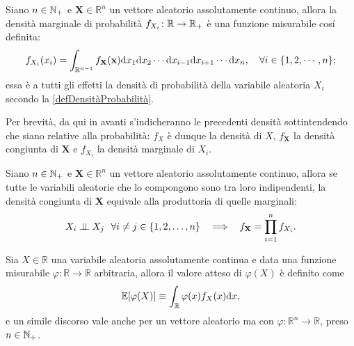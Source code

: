     \begin{dfn}
      \label{defDensitàMarginaleProbabilità}
      Siano \(n\in\mathbb N_+\) e \(\mathbf X\in\mathbb R^n\) un vettore aleatorio assolutamente continuo, allora la densità marginale di probabilità \(f_{X_i}\colon\mathbb R\to\mathbb R_+\) è una funzione misurabile cosí definita:
      \begin{equation}
        \label{eqDensitàMarginaleProbabilità}
        f_{X_i}(x_i)=\int_{\mathbb R^{n-1}}
        f_{\mathbf X}(\mathbf x)\mathrm{d} x_1\mathrm{d} x_2\cdots\mathrm{d} x_{i-1}\mathrm{d} x_{i+1}\cdots\mathrm{d} x_n,
        \quad\forall i\in\{1,2,\cdots,n\};
      \end{equation}
      essa è a tutti gli effetti la densità di probabilità della variabile aleatoria \(X_i\) secondo la \cref{defDensitàProbabilità}.
    \end{dfn}

    \begin{oss}
      Per brevità, da qui in avanti s'indicheranno le precedenti densità sottintendendo che siano relative alla probabilità: \(f_X\) è dunque la densità di \(X\), \(f_{\mathbf X}\) la densità congiunta di \(\mathbf X\) e \(f_{X_i}\) la densità marginale di \(X_i\).

    \end{oss}

    \begin{prt}
      \label{prtDensitàCongiuntaIndipendente}
      Siano \(n\in\mathbb N_+\) e \(\mathbf X\in\mathbb R^n\) un vettore aleatorio assolutamente continuo, allora se tutte le variabili aleatorie che lo compongono sono tra loro indipendenti, la densità congiunta di \(\mathbf X\) equivale alla produttoria di quelle marginali:
      \[
        X_i\independent X_j
        \ \ \forall i\neq j\in\{1,2,\ldots,n\}
        \ \ \implies\ \ 
        f_{\mathbf X}=\prod_{i=1}^nf_{X_i}.
      \]
    \end{prt}

    \begin{dfn}
      \label{defValoreAtteso}
      Sia \(X\in\mathbb R\) una variabile aleatoria assolutamente continua e data una funzione misurabile \(\varphi\colon\mathbb R\to\mathbb R\) arbitraria, allora il valore atteso di \(\varphi(X)\) è definito come
      \[
        \mathbb E[\varphi(X)]\equiv\int_{\mathbb R}\varphi(x)f_X(x)\mathrm{d} x,
      \]
      e un simile discorso vale anche per un vettore aleatorio ma con \(\varphi\colon\mathbb R^n\to\mathbb R\), preso \(n\in\mathbb N_+\).%
    \end{dfn}

